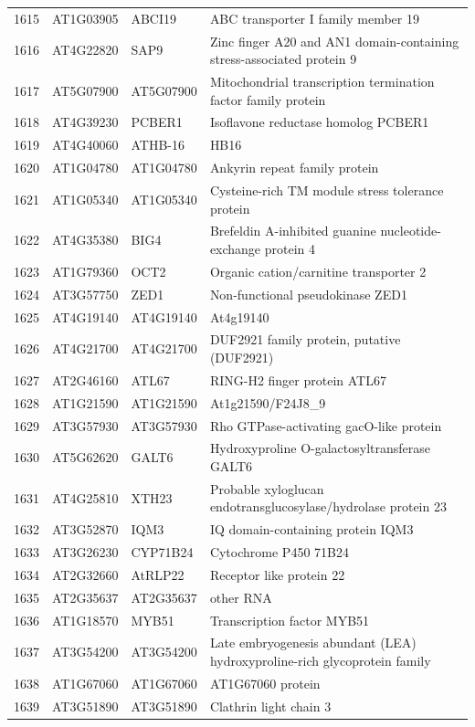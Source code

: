 \documentclass[11pt]{article}
\begin{document}
\begin{center}
\begin{tabular}{rlll}
1615 & AT1G03905 & ABCI19 & ABC transporter I family member 19\\
1616 & AT4G22820 & SAP9 & Zinc finger A20 and AN1 domain-containing stress-associated protein 9\\
1617 & AT5G07900 & AT5G07900 & Mitochondrial transcription termination factor family protein\\
1618 & AT4G39230 & PCBER1 & Isoflavone reductase homolog PCBER1\\
1619 & AT4G40060 & ATHB-16 & HB16\\
1620 & AT1G04780 & AT1G04780 & Ankyrin repeat family protein\\
1621 & AT1G05340 & AT1G05340 & Cysteine-rich TM module stress tolerance protein\\
1622 & AT4G35380 & BIG4 & Brefeldin A-inhibited guanine nucleotide-exchange protein 4\\
1623 & AT1G79360 & OCT2 & Organic cation/carnitine transporter 2\\
1624 & AT3G57750 & ZED1 & Non-functional pseudokinase ZED1\\
1625 & AT4G19140 & AT4G19140 & At4g19140\\
1626 & AT4G21700 & AT4G21700 & DUF2921 family protein, putative (DUF2921)\\
1627 & AT2G46160 & ATL67 & RING-H2 finger protein ATL67\\
1628 & AT1G21590 & AT1G21590 & At1g21590/F24J8\_9\\
1629 & AT3G57930 & AT3G57930 & Rho GTPase-activating gacO-like protein\\
1630 & AT5G62620 & GALT6 & Hydroxyproline O-galactosyltransferase GALT6\\
1631 & AT4G25810 & XTH23 & Probable xyloglucan endotransglucosylase/hydrolase protein 23\\
1632 & AT3G52870 & IQM3 & IQ domain-containing protein IQM3\\
1633 & AT3G26230 & CYP71B24 & Cytochrome P450 71B24\\
1634 & AT2G32660 & AtRLP22 & Receptor like protein 22\\
1635 & AT2G35637 & AT2G35637 & other RNA\\
1636 & AT1G18570 & MYB51 & Transcription factor MYB51\\
1637 & AT3G54200 & AT3G54200 & Late embryogenesis abundant (LEA) hydroxyproline-rich glycoprotein family\\
1638 & AT1G67060 & AT1G67060 & AT1G67060 protein\\
1639 & AT3G51890 & AT3G51890 & Clathrin light chain 3\\

\end{tabular}
\end{center}
\end{document}
